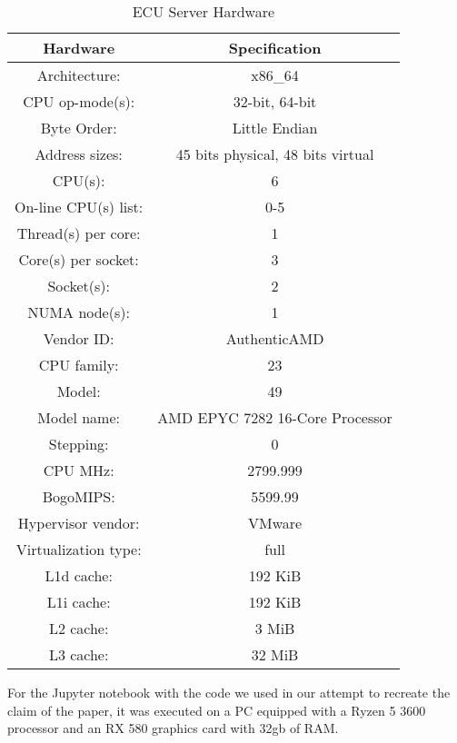 \documentclass[conference]{IEEEtran}
\begin{document}
\begin{table}
\centering
\begin{tabular}{ |c|c| }
	\hline
	{Hardware} & {Specification} \\
	\hline
    Architecture:         &   x86\_64 \\
    CPU op-mode(s):       &   32-bit, 64-bit \\
    Byte Order:           &   Little Endian \\
    Address sizes:        &   45 bits physical, 48 bits virtual \\
    CPU(s):               &   6 \\
    On-line CPU(s) list:  &   0-5 \\
    Thread(s) per core:   &   1 \\
    Core(s) per socket:   &   3 \\
    Socket(s):            &   2 \\
    NUMA node(s):         &   1 \\
    Vendor ID:            &   AuthenticAMD \\
    CPU family:           &   23 \\
    Model:                &   49 \\
    Model name:           &   AMD EPYC 7282 16-Core Processor \\
    Stepping:             &   0 \\
    CPU MHz:              &   2799.999 \\
    BogoMIPS:             &   5599.99 \\
    Hypervisor vendor:    &   VMware \\
    Virtualization type:  &   full \\
    L1d cache:            &   192 KiB \\
    L1i cache:            &   192 KiB \\
    L2 cache:             &   3 MiB \\
    L3 cache:             &   32 MiB \\
	\hline
\end{tabular}
\newline
\caption{\label{tab:Table 1}ECU Server Hardware}
\end{table}

For the Jupyter notebook with the code we used in our attempt to recreate the claim of the paper, it was executed on a PC equipped with a Ryzen 5 3600 processor and an RX 580 graphics card with 32gb of RAM.
\end{document}
